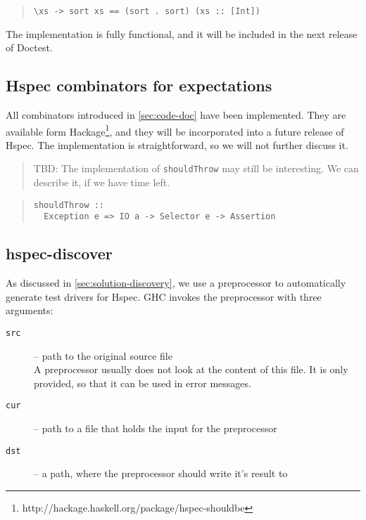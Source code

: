 \documentclass[preprint]{sigplanconf}
\begin{document}
\begin{quote}\small\begin{verbatim}
\xs -> sort xs == (sort . sort) (xs :: [Int])
\end{verbatim}\end{quote}

The implementation is fully functional, and it will be included in the
next release of Doctest.


\subsection{Hspec combinators for expectations}
\label{sec:hspec-comb}

\noindent All combinators introduced in \ref{sec:code-doc} have been
implemented.  They are available form Hackage\footnote{%
http://hackage.haskell.org/package/hspec-shouldbe},
and they will be incorporated into a future
release of Hspec.
The implementation is straightforward, so we will not further discuss
it.

\begin{quote}
    TBD: The implementation of \verb|shouldThrow| may still be
    interesting.  We can describe it, if we have time left.
\end{quote}

\begin{quote}
\small
\begin{verbatim}
shouldThrow ::
  Exception e => IO a -> Selector e -> Assertion
\end{verbatim}
\end{quote}

\subsection{hspec-discover}
\label{sec:implementation-discovery}

As discussed in \ref{sec:solution-discovery}, we use a preprocessor to
automatically generate test drivers for Hspec.  GHC invokes the
preprocessor with three arguments:

\begin{description}
    \item[{\tt src}]
        -- path to the original source file\\
        A preprocessor usually does not
        look at the content of this file.  It is only provided, so
        that it can be used in error messages.
    \item[{\tt cur}]
        -- path to a file that holds the input for the preprocessor
    \item[{\tt dst}]
        -- a path, where the preprocessor should write it's result to
\end{description}
\end{document}
